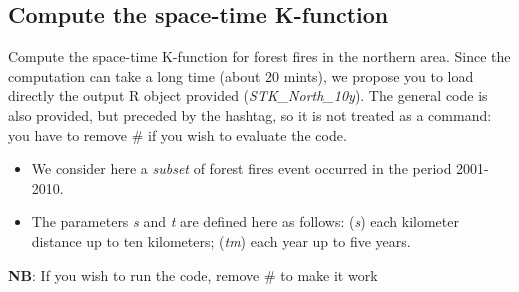 \documentclass[
]{book}
\newenvironment{Shaded}{\begin{snugshade}}{\end{snugshade}}
\newcommand{\CommentTok}[1]{\textcolor[rgb]{0.56,0.35,0.01}{\textit{#1}}}
\newcommand{\DecValTok}[1]{\textcolor[rgb]{0.00,0.00,0.81}{#1}}
\newcommand{\FunctionTok}[1]{\textcolor[rgb]{0.13,0.29,0.53}{\textbf{#1}}}
\newcommand{\NormalTok}[1]{#1}
\newcommand{\OtherTok}[1]{\textcolor[rgb]{0.56,0.35,0.01}{#1}}
\newcommand{\SpecialCharTok}[1]{\textcolor[rgb]{0.81,0.36,0.00}{\textbf{#1}}}
\begin{document}
\begin{Shaded}
\end{Shaded}

\hypertarget{compute-the-space-time-k-function}{%
\subsection{Compute the space-time K-function}\label{compute-the-space-time-k-function}}

Compute the space-time K-function for forest fires in the northern area.
Since the computation can take a long time (about 20 mints), we propose you to load directly the output R object provided (\emph{STK\_North\_10y}).
The general code is also provided, but preceded by the hashtag, so it is not treated as a command: you have to remove \# if you wish to evaluate the code.

\begin{itemize}
\item
  We consider here a \emph{subset} of forest fires event occurred in the period 2001-2010.
\item
  The parameters \emph{s} and \emph{t} are defined here as follows: (\emph{s}) each kilometer distance up to ten kilometers; (\emph{tm}) each year up to five years.
\end{itemize}

\textbf{NB}: If you wish to run the code, remove \# to make it work
\end{document}
